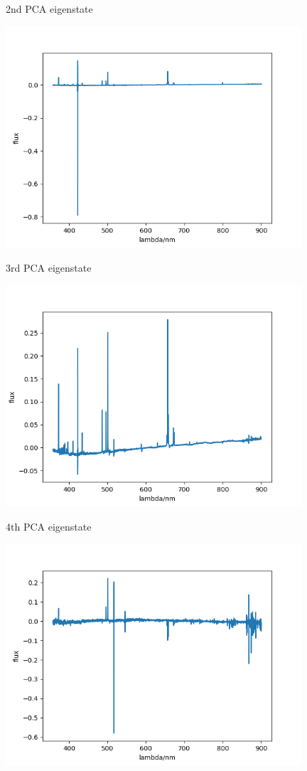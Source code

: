 \documentclass[letterpaper,12pt]{article}
\begin{document}
\begin{table}[!h]
    \centering
    \caption{2nd PCA eigenstate}
    \includegraphics[width=11cm]{7-4-1.png}
\end{table}%

\begin{table}[!h]
    \centering
    \caption{3rd PCA eigenstate}
    \includegraphics[width=11cm]{7-4-2.png}
\end{table}%

\begin{table}[!h]
    \centering
    \caption{4th PCA eigenstate}
    \includegraphics[width=11cm]{7-4-3.png}
\end{table}%
\end{document}
